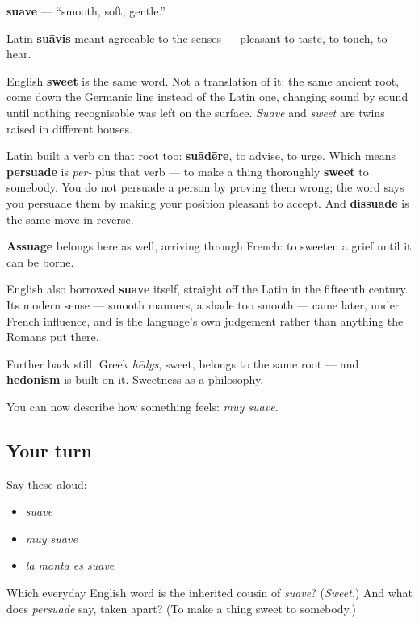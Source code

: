 \begin{cousinweb}
\textbf{suave} — \textquotedblleft{}smooth, soft, gentle.\textquotedblright{}

Latin \textbf{suāvis} meant agreeable to the senses — pleasant to taste, to touch, to hear.

English \textbf{sweet} is the same word. Not a translation of it: the same ancient root, come down the Germanic line instead of the Latin one, changing sound by sound until nothing recognisable was left on the surface. \emph{Suave} and \emph{sweet} are twins raised in different houses.

Latin built a verb on that root too: \textbf{suādēre}, to advise, to urge. Which means \textbf{persuade} is \emph{per-} plus that verb — to make a thing thoroughly \textbf{sweet} to somebody. You do not persuade a person by proving them wrong; the word says you persuade them by making your position pleasant to accept. And \textbf{dissuade} is the same move in reverse.

\textbf{Assuage} belongs here as well, arriving through French: to sweeten a grief until it can be borne.

English also borrowed \textbf{suave} itself, straight off the Latin in the fifteenth century. Its modern sense — smooth manners, a shade too smooth — came later, under French influence, and is the language's own judgement rather than anything the Romans put there.

Further back still, Greek \emph{hēdys}, sweet, belongs to the same root — and \textbf{hedonism} is built on it. Sweetness as a philosophy.
\end{cousinweb}

\begin{grammarlens}[title={What you've built}]
You can now describe how something feels: \emph{muy suave}.
\end{grammarlens}

\subsection*{Your turn}
Say these aloud:

\begin{itemize}
\raggedright
  \item \emph{suave}
  \item \emph{muy suave}
  \item \emph{la manta es suave}
\end{itemize}

\begin{tcolorbox}[breakable,colback=teal!4,colframe=teal!35!black,title={Before you move on}]
Which everyday English word is the inherited cousin of \emph{suave}? (\emph{Sweet}.) And what does \emph{persuade} say, taken apart? (To make a thing sweet to somebody.)
\end{tcolorbox}
